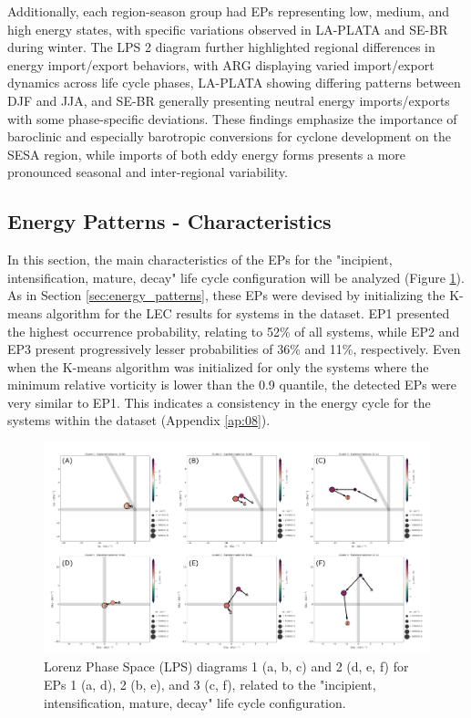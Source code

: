 Additionally, each region-season group had EPs representing low, medium, and high energy states, with specific variations observed in LA-PLATA and SE-BR during winter. The LPS 2 diagram further highlighted regional differences in energy import/export behaviors, with ARG displaying varied import/export dynamics across life cycle phases, LA-PLATA showing differing patterns between DJF and JJA, and SE-BR generally presenting neutral energy imports/exports with some phase-specific deviations. These findings emphasize the importance of baroclinic and especially barotropic conversions for cyclone development on the SESA region, while imports of both eddy energy forms presents a more pronounced seasonal and inter-regional variability.

\subsection{Energy Patterns - Characteristics}\label{ch:ep_mean_features}

In this section, the main characteristics of the EPs for the "incipient, intensification, mature, decay" life cycle configuration will be analyzed (Figure \ref{fig:lps_energy_patterns_IcItDM}). As in Section \ref{sec:energy_patterns}, these EPs were devised by initializing the K-means algorithm for the LEC results for systems in the dataset. EP1 presented the highest occurrence probability, relating to 52\% of all systems, while EP2 and EP3 present progressively lesser probabilities of 36\% and 11\%, respectively. Even when the K-means algorithm was initialized for only the systems where the minimum relative vorticity is lower than the 0.9 quantile, the detected EPs were very similar to EP1. This indicates a consistency in the energy cycle for the systems within the dataset (Appendix \ref{ap:08}).


\begin{figure}[!htbp]
\centering
\includegraphics[width=\textwidth]{figs_6/lps_energy_patterns_IcItDM.pdf}
\caption[Energy Patterns]{Lorenz Phase Space (LPS) diagrams 1 (a, b, c) and 2 (d, e, f) for EPs 1 (a, d), 2 (b, e), and 3 (c, f), related to the "incipient, intensification, mature, decay" life cycle configuration.}
\label{fig:lps_energy_patterns_IcItDM}
\end{figure}

